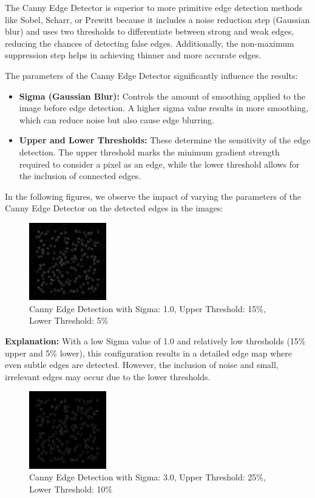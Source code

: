 \documentclass[%
	a4paper, %
	12pt, %
	english, %
	bibtotoc %
]{scrartcl}
\begin{document}
The Canny Edge Detector is superior to more primitive edge detection methods like Sobel, Scharr, or Prewitt because it includes a noise reduction step (Gaussian blur) and uses two thresholds to differentiate between strong and weak edges, reducing the chances of detecting false edges. Additionally, the non-maximum suppression step helps in achieving thinner and more accurate edges.

The parameters of the Canny Edge Detector significantly influence the results:
\begin{itemize}
    \item \textbf{Sigma (Gaussian Blur):} Controls the amount of smoothing applied to the image before edge detection. A higher sigma value results in more smoothing, which can reduce noise but also cause edge blurring.
    \item \textbf{Upper and Lower Thresholds:} These determine the sensitivity of the edge detection. The upper threshold marks the minimum gradient strength required to consider a pixel as an edge, while the lower threshold allows for the inclusion of connected edges.
\end{itemize}

In the following figures, we observe the impact of varying the parameters of the Canny Edge Detector on the detected edges in the images:

\begin{figure}[H]
    \centering
    \includegraphics[width=0.3\textwidth]{latex-template-ss24/images/1_15_5_canny.png}
    \caption{Canny Edge Detection with Sigma: 1.0, Upper Threshold: 15\%, Lower Threshold: 5\%}
    \label{fig:1_15_5_canny}
\end{figure}

\textbf{Explanation:} With a low Sigma value of 1.0 and relatively low thresholds (15\% upper and 5\% lower), this configuration results in a detailed edge map where even subtle edges are detected. However, the inclusion of noise and small, irrelevant edges may occur due to the lower thresholds.

\begin{figure}[H]
    \centering
    \includegraphics[width=0.3\textwidth]{latex-template-ss24/images/3_25_10_canny.png}
    \caption{Canny Edge Detection with Sigma: 3.0, Upper Threshold: 25\%, Lower Threshold: 10\%}
    \label{fig:3_25_10_canny}
\end{figure}
\end{document}

